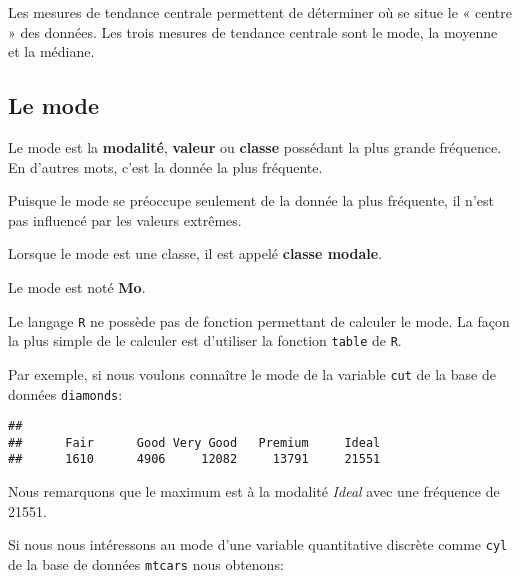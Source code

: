 \documentclass[]{book}
\newenvironment{Shaded}{\begin{snugshade}}{\end{snugshade}}
\newcommand{\KeywordTok}[1]{\textcolor[rgb]{0.13,0.29,0.53}{\textbf{#1}}}
\newcommand{\OperatorTok}[1]{\textcolor[rgb]{0.81,0.36,0.00}{\textbf{#1}}}
\newcommand{\NormalTok}[1]{#1}
\begin{document}
Les mesures de tendance centrale permettent de déterminer où se situe le
« centre » des données. Les trois mesures de tendance centrale sont le
mode, la moyenne et la médiane.

\subsection{Le mode}\label{le-mode}

Le mode est la \textbf{modalité}, \textbf{valeur} ou \textbf{classe}
possédant la plus grande fréquence. En d'autres mots, c'est la donnée la
plus fréquente.

Puisque le mode se préoccupe seulement de la donnée la plus fréquente,
il n'est pas influencé par les valeurs extrêmes.

Lorsque le mode est une classe, il est appelé \textbf{classe modale}.

Le mode est noté \textbf{Mo}.

Le langage \texttt{R} ne possède pas de fonction permettant de calculer
le mode. La façon la plus simple de le calculer est d'utiliser la
fonction \texttt{table} de \texttt{R}.

Par exemple, si nous voulons connaître le mode de la variable
\texttt{cut} de la base de données \texttt{diamonds}:

\begin{Shaded}
\end{Shaded}

\begin{verbatim}
## 
##      Fair      Good Very Good   Premium     Ideal 
##      1610      4906     12082     13791     21551
\end{verbatim}

Nous remarquons que le maximum est à la modalité \emph{Ideal} avec une
fréquence de 21551.

Si nous nous intéressons au mode d'une variable quantitative discrète
comme \texttt{cyl} de la base de données \texttt{mtcars} nous obtenons:

\begin{Shaded}
\end{Shaded}
\end{document}
